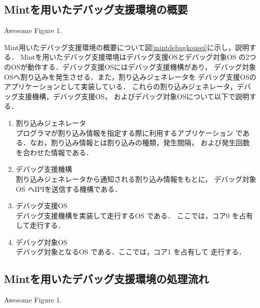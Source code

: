\documentclass[tanilab-enum]{graduate}
\begin{document}
    \subsection{Mintを用いたデバッグ支援環境の概要}
{Awesome Figure 1.}

Mint用いたデバッグ支援環境の概要について図\ref{mintdebugkousei}に示し，説明する．
    Mintを用いたデバッグ支援環境はデバッグ支援OSとデバッグ対象OS
    の2つのOSが動作する．デバッグ支援OSにはデバッグ支援機構があり，
    デバッグ対象OSへ割り込みを発生させる．また，割り込みジェネレータを
    デバッグ支援OSのアプリケーションとして実装している．
    これらの割り込みジェネレータ，デバッグ支援機構，デバッグ支援OS，
    およびデバッグ対象OSについて以下で説明する．
    \begin{enumerate}
        \item 割り込みジェネレータ\\
            プログラマが割り込み情報を指定する際に利用するアプリケーション
            である．なお，割り込み情報とは割り込みの種類，発生間隔，
            および発生回数を合わせた情報である．
        \item デバッグ支援機構\\
            割り込みジェネレータから通知される割り込み情報をもとに，
            デバッグ対象OS へIPIを送信する機構である．
        \item デバッグ支援OS\\
            デバッグ支援機構を実装して走行するOS である．
            ここでは，コア0 を占有して走行する．
        \item デバッグ対象OS\\
            デバッグ対象となるOS である．ここでは，コア1 を占有して
            走行する．
    \end{enumerate}
    \subsection{Mintを用いたデバッグ支援環境の処理流れ}
{Awesome Figure 1.}
\end{document}
